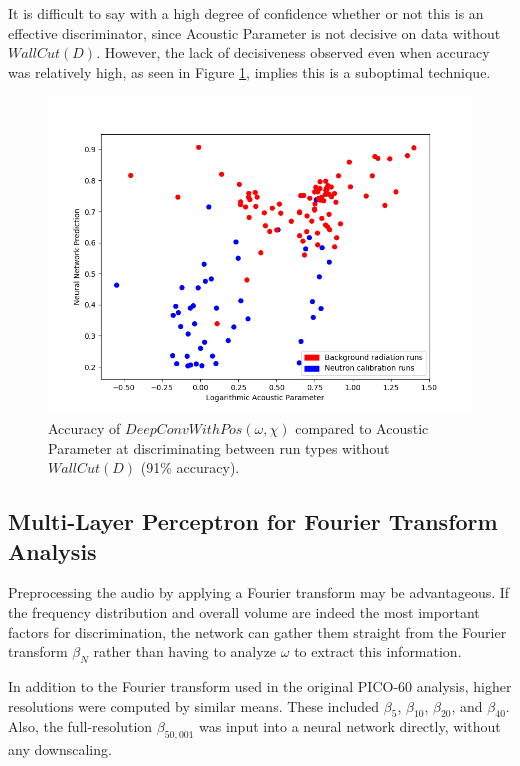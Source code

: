 \documentclass[10pt]{article}
\begin{document}
It is difficult to say with a high degree of confidence whether or not this is an effective discriminator, since Acoustic Parameter is not decisive on data without $WallCut(D)$. However, the lack of decisiveness observed even when accuracy was relatively high, as seen in Figure \ref{waveform_best_validation}, implies this is a suboptimal technique.

\begin{figure}[h]
    \centering
    \includegraphics[width=\textwidth]{waveform_best_validation}
    \caption{\label{waveform_best_validation} Accuracy of $DeepConvWithPos(\omega, \chi)$ compared to Acoustic Parameter at discriminating between run types without $WallCut(D)$ (91\% accuracy).}
\end{figure}

\subsection{Multi-Layer Perceptron for Fourier Transform Analysis}

Preprocessing the audio by applying a Fourier transform may be advantageous. If the frequency distribution and overall volume are indeed the most important factors for discrimination, the network can gather them straight from the Fourier transform $\beta_{N}$ rather than having to analyze $\omega$ to extract this information.

In addition to the Fourier transform used in the original PICO-60 analysis, higher resolutions were computed by similar means. These included $\beta _{5}$, $\beta _{10}$, $\beta _{20}$, and $\beta _{40}$. Also, the full-resolution $\beta _{50,001}$ was input into a neural network directly, without any downscaling.
\end{document}

